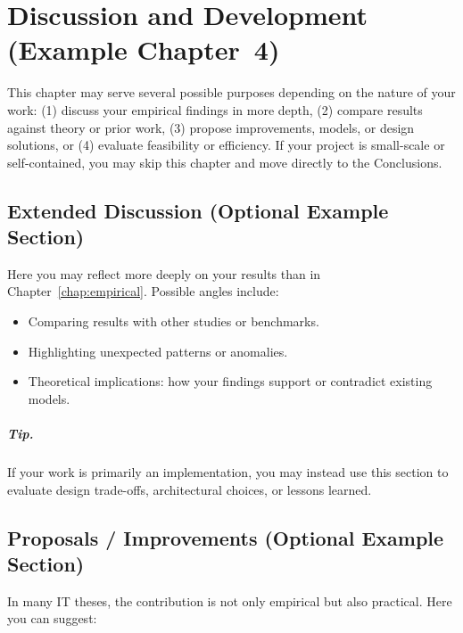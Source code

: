 \chapter{Discussion and Development (Example Chapter~4)}
\label{chap:discussion}


This chapter may serve several possible purposes depending on the nature of your work:  
(1) discuss your empirical findings in more depth,  
(2) compare results against theory or prior work,  
(3) propose improvements, models, or design solutions, or  
(4) evaluate feasibility or efficiency.  
If your project is small-scale or self-contained, you may skip this chapter and move directly to the Conclusions.

\section{Extended Discussion (Optional Example Section)}
\label{sec:discussion-extended}
Here you may reflect more deeply on your results than in Chapter~\ref{chap:empirical}.  
Possible angles include:

\begin{itemize}[leftmargin=1.2cm]
  \item Comparing results with other studies or benchmarks.  
  \item Highlighting unexpected patterns or anomalies.  
  \item Theoretical implications: how your findings support or contradict existing models.  
\end{itemize}

\paragraph{Tip.} If your work is primarily an implementation, you may instead use this section to evaluate design trade-offs, architectural choices, or lessons learned.

\section{Proposals / Improvements (Optional Example Section)}
\label{sec:proposals}
In many IT theses, the contribution is not only empirical but also practical.  
Here you can suggest:

